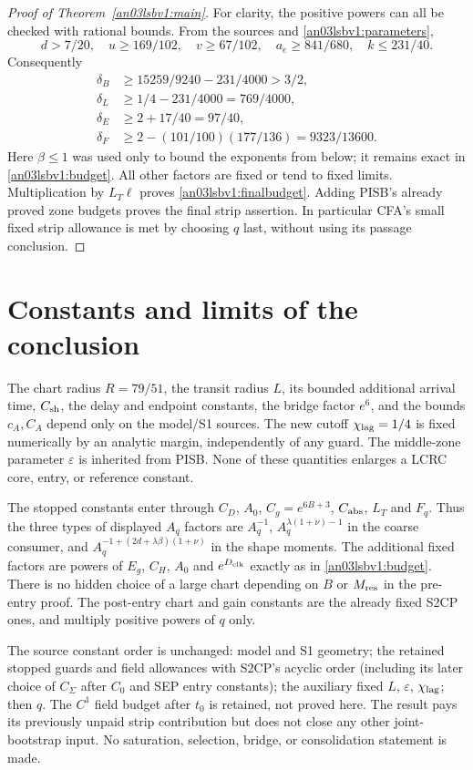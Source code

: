 \documentclass[11pt]{article}
\theoremstyle{remark}\newtheorem{remark}[theorem]{Remark}
\newcommand{\eps}{\varepsilon}
\begin{document}
\begin{proof}[Proof of Theorem~\ref{an03lsbv1:main}]
For clarity, the positive powers can all be checked with rational
bounds. From the sources and \eqref{an03lsbv1:parameters},
\[
 d>7/20,\quad u\ge169/102,\quad v\ge67/102,\quad
 a_e\ge841/680,\quad k\le231/40.
\]
Consequently
\begin{align*}
 \delta_B&\ge15259/9240-231/4000>3/2,\\
 \delta_L&\ge1/4-231/4000=769/4000,\\
 \delta_E&\ge2+17/40=97/40,\\
 \delta_F&\ge2-(101/100)(177/136)=9323/13600.
\end{align*}
Here $\beta\le1$ was used only to bound the exponents from below;
it remains exact in \eqref{an03lsbv1:budget}. All other factors are
fixed or tend to fixed limits. Multiplication by $L_T\ell$ proves
\eqref{an03lsbv1:finalbudget}. Adding PISB's already proved zone
budgets proves the final strip assertion. In particular CFA's
small fixed strip allowance is met by choosing $q$ last, without
using its passage conclusion.
\end{proof}

\section{Constants and limits of the conclusion}
The chart radius $R=79/51$, the transit radius $L$, its bounded
additional arrival time, $C_{\rm sh}$, the delay and endpoint
constants, the bridge factor $e^6$, and the bounds $c_A,C_A$ depend
only on the model/S1 sources. The new cutoff $\chi_{\rm lag}=1/4$ is fixed
numerically by an analytic margin, independently of any guard.
The middle-zone parameter $\eps$ is inherited from PISB. None of
these quantities enlarges a LCRC core, entry, or reference constant.

The stopped constants enter through $C_D$, $A_0$, $C_g=e^{6B+3}$,
$C_{\rm abs}$, $L_T$ and $F_q$. Thus the three types of displayed
$A_q$ factors are $A_q^{-1}$, $A_q^{\lambda(1+\nu)-1}$ in the
coarse consumer, and
$A_q^{-1+(2d+\lambda\beta)(1+\nu)}$ in the shape moments.
The additional fixed factors are powers of $E_g$, $C_H$, $A_0$
and $e^{D_{\rm clk}}$ exactly as in \eqref{an03lsbv1:budget}.
There is no hidden choice of a large chart depending on $B$ or
$M_{\rm res}$ in the pre-entry proof. The post-entry chart and gain
constants are the already fixed S2CP ones, and multiply positive
powers of $q$ only.

The source constant order is unchanged: model and S1 geometry;
the retained stopped guards and field allowances with S2CP's acyclic
order (including its later choice of $C_\Sigma$ after $C_0$ and SEP
entry constants); the auxiliary fixed $L$, $\eps$, $\chi_{\rm lag}$; then $q$.
The $C^1$ field budget after $t_0$ is retained, not proved here.
The result pays its previously unpaid strip contribution but does
not close any other joint-bootstrap input. No saturation, selection,
bridge, or consolidation statement is made.
\end{document}

